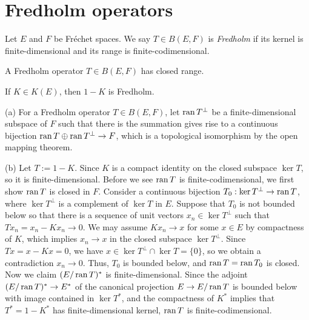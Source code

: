 \documentclass{../../large}
\begin{document}
\section{Fredholm operators}

\begin{prb}
Let $E$ and $F$ be Fr\'echet spaces.
We say $T\in B(E,F)$ is \emph{Fredholm} if its kernel is finite-dimensional and its range is finite-codimensional.
\begin{parts}
\item A Fredholm operator $T\in B(E,F)$ has closed range.
\item If $K\in K(E)$, then $1-K$ is Fredholm.
\end{parts}
\end{prb}
\begin{pf}
(a)
For a Fredholm operator $T\in B(E,F)$, let $\operatorname{ran} T^\perp$ be a finite-dimensional subspace of $F$ such that there is the summation gives rise to a continuous bijection $\operatorname{ran} T\oplus\operatorname{ran} T^\perp\to F$, which is a topological isomorphism by the open mapping theorem.

(b)
Let $T:=1-K$.
Since $K$ is a compact identity on the closed subspace $\ker T$, so it is finite-dimensional.
Before we see $\operatorname{ran} T$ is finite-codimensional, we first show $\operatorname{ran} T$ is closed in $F$.
Consider a continuous bijection $T_0:\ker T^\perp\to\operatorname{ran} T$, where $\ker T^\perp$ is a complement of $\ker T$ in $E$.
Suppose that $T_0$ is not bounded below so that there is a sequence of unit vectors $x_n\in\ker T^\perp$ such that $Tx_n=x_n-Kx_n\to0$.
We may assume $Kx_n\to x$ for some $x\in E$ by compactness of $K$, which implies $x_n\to x$ in the closed subspace $\ker T^\perp$.
Since $Tx=x-Kx=0$, we have $x\in\ker T^\perp\cap\ker T=\{0\}$, so we obtain a contradiction $x_n\to0$.
Thus, $T_0$ is bounded below, and $\operatorname{ran} T=\operatorname{ran} T_0$ is closed.
Now we claim $(E/\operatorname{ran} T)^*$ is finite-dimensional.
Since the adjoint $(E/\operatorname{ran} T)^*\to E^*$ of the canonical projection $E\to E/\operatorname{ran} T$ is bounded below with image contained in $\ker T^*$, and the compactness of $K^*$ implies that $T^*=1-K^*$ has finite-dimensional kernel, $\operatorname{ran} T$ is finite-codimensional.
\end{pf}
\end{document}

